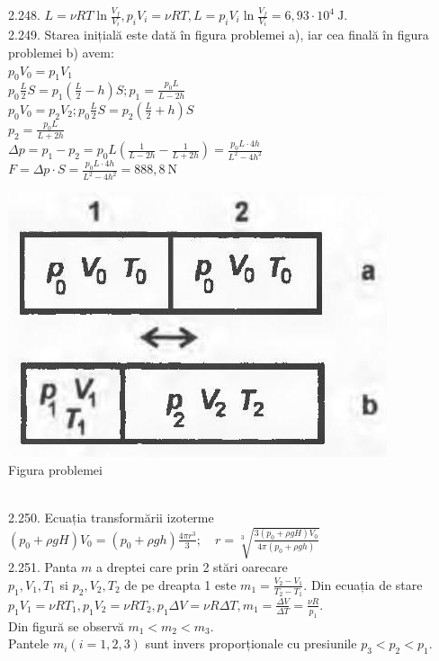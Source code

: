 2.248. $L=\nu R T \ln \frac{V_{f}}{V_{i}}, p_{i} V_{i}=\nu R T, L=p_{i} V_{i} \ln \frac{V_{f}}{V_{i}}=6,93 \cdot 10^{4} \mathrm{~J}$.\\

2.249. Starea inițială este dată în figura problemei a), iar cea finală în figura problemei b) avem:\\ $p_{0} V_{0}=p_{1} V_{1}$\\ $p_{0} \frac{L}{2} S=p_{1}\left(\frac{L}{2}-h\right) S ; p_{1}=\frac{p_{0} L}{L-2 h}$\\ $p_{0} V_{0}=p_{2} V_{2} ; p_{0} \frac{L}{2} S=p_{2}\left(\frac{L}{2}+h\right) S$\\ $p_{2}=\frac{p_{0} L}{L+2 h}$\\ $\Delta p=p_{1}-p_{2}=p_{0} L\left(\frac{1}{L-2 h}-\frac{1}{L+2 h}\right)=\frac{p_{0} L \cdot 4 h}{L^{2}-4 h^{2}}$\\ $F=\Delta p \cdot S=\frac{p_{0} L \cdot 4 h}{L^{2}-4 h^{2}}=888,8 \mathrm{~N}$\\ \begin{center} \includegraphics[width=0.4\linewidth]{images/2025_07_01_5b3ff9fa0d508c8e9f17g-324}\\ Figura problemei \end{center}\\

2.250. Ecuația transformării izoterme\\ $\left(p_{0}+\rho g H\right) V_{0}=\left(p_{0}+\rho g h\right) \frac{4 \pi r^{3}}{3} ; \quad r=\sqrt[3]{\frac{3\left(p_{0}+\rho g H\right) V_{0}}{4 \pi\left(p_{0}+\rho g h\right)}}$\\

2.251. Panta $m$ a dreptei care prin 2 stări oarecare\\ $p_{1}, V_{1}, T_{1}$ si $p_{2}, V_{2}, T_{2}$ de pe dreapta 1 este $m_{1}=\frac{V_{2}-V_{1}}{T_{2}-T_{1}}$. Din ecuația de stare $p_{1} V_{1}=\nu R T_{1}, p_{1} V_{2}=\nu R T_{2}, p_{1} \Delta V=\nu R \Delta T, m_{1}=\frac{\Delta V}{\Delta T}=\frac{\nu R}{p_{1}}$.\\ Din figură se observă $m_{1}<m_{2}<m_{3}$.\\ Pantele $m_{i}(i=1,2,3)$ sunt invers proporționale cu presiunile $p_{3}<p_{2}<p_{1}$.\\

